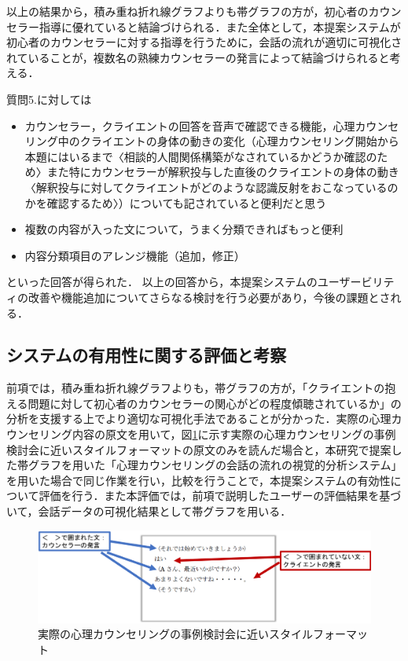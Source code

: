 \documentclass[shuuron]{kuee}
\begin{document}
以上の結果から，積み重ね折れ線グラフよりも帯グラフの方が，初心者のカウンセラー指導に優れていると結論づけられる．また全体として，本提案システムが初心者のカウンセラーに対する指導を行うために，会話の流れが適切に可視化されていることが，複数名の熟練カウンセラーの発言によって結論づけられると考える．

質問5.に対しては

\begin{itemize}

  \item カウンセラー，クライエントの回答を音声で確認できる機能，心理カウンセリング中のクライエントの身体の動きの変化（心理カウンセリング開始から本題にはいるまで〈相談的人間関係構築がなされているかどうか確認のため〉また特にカウンセラーが解釈投与した直後のクライエントの身体の動き〈解釈投与に対してクライエントがどのような認識反射をおこなっているのかを確認するため〉）についても記されていると便利だと思う
  \item 複数の内容が入った文について，うまく分類できればもっと便利
  \item 内容分類項目のアレンジ機能（追加，修正）
\end{itemize}
といった回答が得られた．
以上の回答から，本提案システムのユーザービリティの改善や機能追加についてさらなる検討を行う必要があり，今後の課題とされる．



\subsection{システムの有用性に関する評価と考察}%



前項では，積み重ね折れ線グラフよりも，帯グラフの方が，「クライエントの抱える問題に対して初心者のカウンセラーの関心がどの程度傾聴されているか」の分析を支援する上でより適切な可視化手法であることが分かった．実際の心理カウンセリング内容の原文を用いて，図\ref{fig:pdf}に示す実際の心理カウンセリングの事例検討会に近いスタイルフォーマットの原文のみを読んだ場合と，本研究で提案した帯グラフを用いた「心理カウンセリングの会話の流れの視覚的分析システム」を用いた場合で同じ作業を行い，比較を行うことで，本提案システムの有効性について評価を行う．また本評価では，前項で説明したユーザーの評価結果を基づいて，会話データの可視化結果として帯グラフを用いる．

\begin{figure}
  \begin{center}
    \includegraphics[width=\linewidth]{pdf.png}
  \end{center}
  \caption{実際の心理カウンセリングの事例検討会に近いスタイルフォーマット}
  \label{fig:pdf}
\end{figure}
\end{document}
